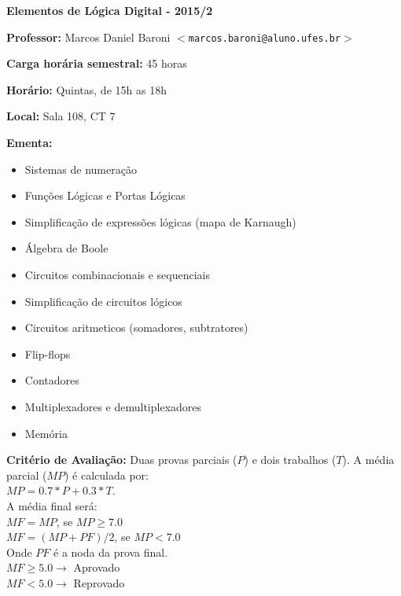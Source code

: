 \documentclass{article}
\newcommand{\titulo}[1]{{\bf #1}}
\begin{document}

\begin{center}
{\LARGE \bf Elementos de Lógica Digital - 2015/2}
\vspace{5mm}
\end{center}

\noindent
\titulo{Professor:} Marcos Daniel Baroni $<$\texttt{marcos.baroni@aluno.ufes.br}$>$

\noindent
\titulo{Carga horária semestral:} 45 horas

\noindent
\titulo{Horário:} Quintas, de 15h as 18h

\noindent
\titulo{Local:} Sala 108, CT 7

\noindent
\titulo{Ementa:}
\begin{itemize}
  \setlength\itemsep{-3pt}
  \item Sistemas de numeração
  \item Funções Lógicas e Portas Lógicas
  \item Simplificação de expressões lógicas (mapa de Karnaugh)
  \item Álgebra de Boole
  \item Circuitos combinacionais e sequenciais
  \item Simplificação de circuitos lógicos
  \item Circuitos aritmeticos (somadores, subtratores)
  \item Flip-flops
  \item Contadores
  \item Multiplexadores e demultiplexadores
  \item Memória
\end{itemize}

\noindent
\titulo{Critério de Avaliação:}
Duas provas parciais ($P$) e dois trabalhos ($T$).
A média parcial ($MP$) é calculada por:\\
\noindent \hspace*{12pt} $ MP = 0.7*P + 0.3 *T$. \\
\noindent A média final será:\\
\noindent \hspace*{12pt} $MF = MP$, \hspace{40pt} se $MP \geqslant 7.0$ \\
\noindent \hspace*{12pt} $MF = (MP+PF)/2$, \hspace{4pt} se $MP < 7.0$ \\
\noindent Onde $PF$ é a noda da prova final.\\
\noindent \hspace*{12pt} $MF \geqslant 5.0 \rightarrow$ \textrm{Aprovado} \\
\noindent \hspace*{12pt} $MF < 5.0 \rightarrow$ \textrm{Reprovado}
\\
\end{document}
